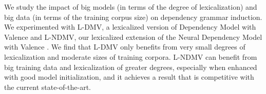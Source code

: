 We study the impact of big models (in terms of the degree of lexicalization) and big data (in terms of the training corpus size) on dependency grammar induction. We experimented with L-DMV, a lexicalized version of Dependency Model with Valence \cite{Klein:2004:CIS:1218955.1219016} and L-NDMV, our lexicalized extension of the Neural Dependency Model with Valence \cite{jiang-han-tu:2016:EMNLP2016}. We find that L-DMV only benefits from very small degrees of lexicalization and moderate sizes of training corpora. L-NDMV can benefit from big training data and lexicalization of greater degrees, especially when enhanced with good model initialization, and it achieves a result that is competitive with the current state-of-the-art.
